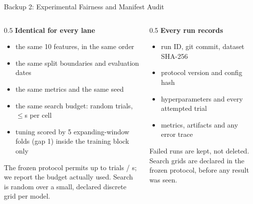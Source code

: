\documentclass[aspectratio=169,11pt]{beamer}
\newcommand{\repourl}{https://github.com/Steven-ZYC/INT4096-ML-Financial-Forecasting}
\newcommand{\currentrepolink}{}
\newcommand{\repolink}[2]{\gdef\currentrepolink{%
  \href{\repourl/#1/main/#2}{\color{accent}GitHub: \texttt{\detokenize{#2}}}}}
\begin{document}
\begin{frame}{Backup 2: Experimental Fairness and Manifest Audit}
  \repolink{blob}{src/int4096/experiments/manifest.py}
  \begin{columns}[T]
    \begin{column}{0.5\textwidth}
      \textbf{Identical for every lane}
      \begin{itemize}\scriptsize
        \item the same 10 features, in the same order
        \item the same split boundaries and evaluation dates
        \item the same metrics and the same seed
        \item the same search budget: \TrialsUsed{} random trials,
              $\le$\SecondsUsed{}s per cell
        \item tuning scored by 5 expanding-window folds (gap 1)
              inside the training block only
      \end{itemize}
      \footnotesize
      {\scriptsize The frozen protocol permits up to \TrialsMax{} trials /
       \SecondsMax{}s; we report the budget actually used. Search is random
       over a small, declared discrete grid per model.}
    \end{column}
    \begin{column}{0.5\textwidth}
      \textbf{Every run records}
      \begin{itemize}\scriptsize
        \item run ID, git commit, dataset SHA-256
        \item protocol version and config hash
        \item hyperparameters and every attempted trial
        \item metrics, artifacts and any error trace
      \end{itemize}
      \footnotesize
      {\scriptsize Failed runs are kept, not deleted. Search grids are declared
       in the frozen protocol, before any result was seen.}
    \end{column}
  \end{columns}
\end{frame}
\end{document}
